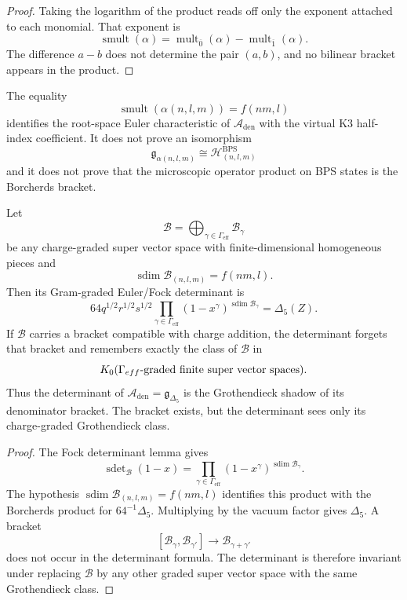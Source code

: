 \documentclass[11pt]{memoir}
\newcommand{\sdim}{\operatorname{sdim}}
\newcommand{\sdet}{\operatorname{sdet}}
\newcommand{\rootmult}{\operatorname{mult}}
\newcommand{\smult}{\operatorname{smult}}
\begin{document}
\begin{proof}
Taking the logarithm of the product reads off only the exponent attached
to each monomial.  That exponent is
$$
\smult(\alpha)=
\rootmult_{\overline0}(\alpha)-\rootmult_{\overline1}(\alpha).
$$
The difference $a-b$ does not determine the pair $(a,b)$, and no
bilinear bracket appears in the product.
\end{proof}

\begin{proposition}
The equality
$$\smult(\alpha(n,l,m))=f(nm,l)$$
identifies the root-space Euler characteristic of
$\mathcal A_{\mathrm{den}}$ with the virtual K3 half-index
coefficient.  It does not prove an isomorphism
$$
\mathfrak g_{\alpha(n,l,m)}
\cong
\mathcal H^{\mathrm{BPS}}_{(n,l,m)}
$$
and it does not prove that the microscopic operator product on BPS
states is the Borcherds bracket.
\end{proposition}

\begin{theorem}
\label{thm:protected-denominator-shadow}
Let
$$
\mathcal B=\bigoplus_{\gamma\in\Gamma_{\mathrm{eff}}}\mathcal B_\gamma
$$
be any charge-graded super vector space with finite-dimensional
homogeneous pieces and
$$\sdim\mathcal B_{(n,l,m)}=f(nm,l).$$
Then its Gram-graded Euler/Fock determinant is
$$
64q^{1/2}r^{1/2}s^{1/2}
\prod_{\gamma\in\Gamma_{\mathrm{eff}}}(1-x^\gamma)^{\sdim\mathcal B_\gamma}
=\Delta_5(Z).
$$
If $\mathcal B$ carries a bracket compatible with charge addition, the
determinant forgets that bracket and remembers exactly the class of
$\mathcal B$ in
$$K_0(\Gamma_{\mathrm{eff}}\hbox{-graded finite super vector spaces}).$$
Thus the determinant of
$\mathcal A_{\mathrm{den}}=\mathfrak g_{\Delta_5}$ is
the Grothendieck shadow of its denominator bracket.  The bracket exists, but the
determinant sees only its charge-graded Grothendieck class.
\end{theorem}

\begin{proof}
The Fock determinant lemma gives
$$
\sdet_{\mathcal B}(1-x)
=\prod_{\gamma\in\Gamma_{\mathrm{eff}}}(1-x^\gamma)^{\sdim\mathcal B_\gamma}.
$$
The hypothesis $\sdim\mathcal B_{(n,l,m)}=f(nm,l)$ identifies this
product with the Borcherds product for $64^{-1}\Delta_5$.  Multiplying
by the vacuum factor gives $\Delta_5$.  A bracket
$$[\mathcal B_\gamma,\mathcal B_{\gamma'}]\to
\mathcal B_{\gamma+\gamma'}$$
does not occur in the determinant formula.  The determinant is therefore
invariant under replacing $\mathcal B$ by any other graded super vector
space with the same Grothendieck class.
\end{proof}
\end{document}

